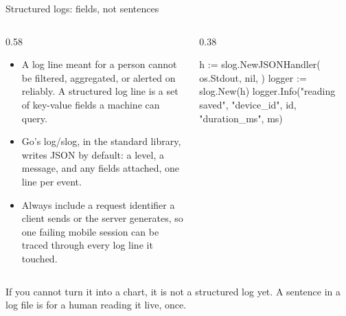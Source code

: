 \documentclass[10pt,aspectratio=169,t]{beamer}
\begin{document}
\begin{frame}[fragile,eyebrow=Deploying]{Structured logs: fields, not sentences}
  \begin{columns}[T]
    \begin{column}{0.58\textwidth}
      \begin{itemize}
        \item A log line meant for a person cannot be filtered, aggregated, or alerted on reliably. A structured log line is a set of key-value fields a machine can query.
        \item Go's log/slog, in the standard library, writes JSON by default: a level, a message, and any fields attached, one line per event.
        \item Always include a request identifier a client sends or the server generates, so one failing mobile session can be traced through every log line it touched.
      \end{itemize}
    \end{column}
    \begin{column}{0.38\textwidth}
\begin{golang}
h := slog.NewJSONHandler(
  os.Stdout, nil,
)
logger := slog.New(h)
logger.Info("reading saved",
  "device_id", id,
  "duration_ms", ms)
\end{golang}
    \end{column}
  \end{columns}
  \begin{takeaway}{If you cannot turn it into a chart, it is not a structured log yet.}
    A sentence in a log file is for a human reading it live, once.
  \end{takeaway}
\end{frame}
\end{document}
